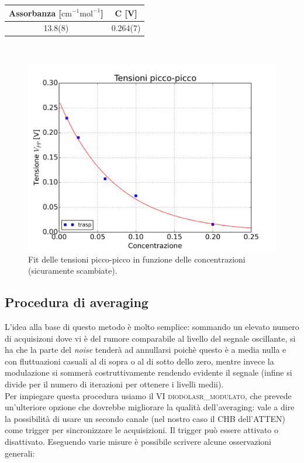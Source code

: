 \documentclass[10pt,letterpaper]{article}
\begin{document}
\begin{table}[h]
\centering
\begin{tabular}{c|c}
Assorbanza [$\mathrm{cm}^{-1}\mathrm{mol}^{-1}$] &  C [V] \\ 
\hline 13.8(8) & 0.264(7) \\ 
 
\end{tabular} 
\end{table}
~\\


\begin{figure}
\centering
\includegraphics[width=0.7\linewidth]{./es13_tens_piccopicco_plot_mod}
\caption{Fit delle tensioni picco-picco in funzione delle concentrazioni (sicuramente scambiate).}
\label{fig:es13_tens_piccopicco_plot_mod}
\end{figure}


\subsection{Procedura di averaging}
L'idea alla base di questo metodo è molto semplice: sommando un elevato numero di acquisizoni dove vi è del rumore comparabile al livello del segnale oscillante, si ha che la parte del \textit{noise} tenderà ad annullarsi poichè questo è a media nulla e con fluttuazioni casuali al di sopra o al di sotto dello zero, mentre invece la modulazione si sommerà costruttivamente rendendo evidente il segnale (infine si divide per il numero di iterazioni per ottenere i livelli medii).\\
Per impiegare questa procedura usiamo il VI \textsc{diodolasr\_modulato}, che prevede un'ulteriore opzione che dovrebbe migliorare la qualità dell'averaging: vale a dire la possibilità di usare un secondo canale (nel nostro caso il CHB dell'ATTEN) come trigger per sincronizzare le acquisizioni. Il trigger può essere attivato o disattivato. Eseguendo varie misure è possibile scrivere alcune osservazioni generali:
\end{document}
